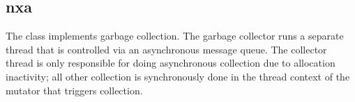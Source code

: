 %
%
%
%
%              

\subsection{nxa}
\label{nxa}

The  class implements garbage collection.  The garbage collector
runs a separate thread that is controlled via an asynchronous message queue.
The collector thread is only responsible for doing asynchronous collection due
to allocation inactivity; all other collection is synchronously done in the
thread context of the mutator that triggers collection.

